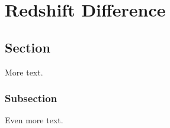 \chapter{Redshift Difference}
\label{cha: redshift difference}

\section{Section}

More text.

\subsection{Subsection}

Even more text.